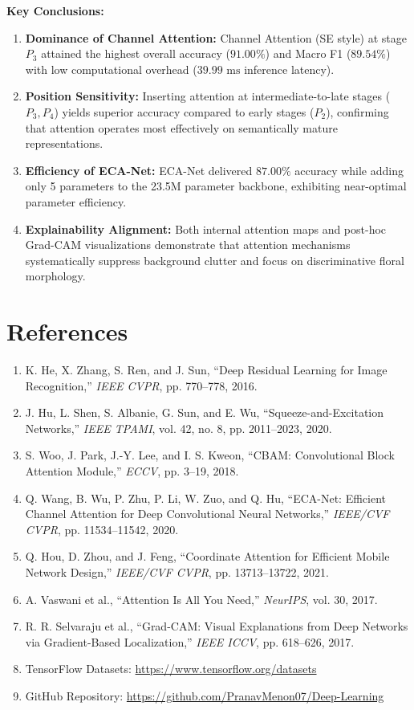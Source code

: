 \documentclass[11pt,a4paper]{article}
\begin{document}
\textbf{Key Conclusions:}
\begin{enumerate}[noitemsep,topsep=0pt]
    \item \textbf{Dominance of Channel Attention:} Channel Attention (SE style) at stage $P_3$ attained the highest overall accuracy ($91.00\%$) and Macro F1 ($89.54\%$) with low computational overhead ($39.99\text{ ms}$ inference latency).
    \item \textbf{Position Sensitivity:} Inserting attention at intermediate-to-late stages ($P_3, P_4$) yields superior accuracy compared to early stages ($P_2$), confirming that attention operates most effectively on semantically mature representations.
    \item \textbf{Efficiency of ECA-Net:} ECA-Net delivered $87.00\%$ accuracy while adding only 5 parameters to the 23.5M parameter backbone, exhibiting near-optimal parameter efficiency.
    \item \textbf{Explainability Alignment:} Both internal attention maps and post-hoc Grad-CAM visualizations demonstrate that attention mechanisms systematically suppress background clutter and focus on discriminative floral morphology.
\end{enumerate}

\section{References}
\begin{enumerate}[noitemsep,topsep=0pt]
    \item K. He, X. Zhang, S. Ren, and J. Sun, ``Deep Residual Learning for Image Recognition,'' \textit{IEEE CVPR}, pp. 770--778, 2016.
    \item J. Hu, L. Shen, S. Albanie, G. Sun, and E. Wu, ``Squeeze-and-Excitation Networks,'' \textit{IEEE TPAMI}, vol. 42, no. 8, pp. 2011--2023, 2020.
    \item S. Woo, J. Park, J.-Y. Lee, and I. S. Kweon, ``CBAM: Convolutional Block Attention Module,'' \textit{ECCV}, pp. 3--19, 2018.
    \item Q. Wang, B. Wu, P. Zhu, P. Li, W. Zuo, and Q. Hu, ``ECA-Net: Efficient Channel Attention for Deep Convolutional Neural Networks,'' \textit{IEEE/CVF CVPR}, pp. 11534--11542, 2020.
    \item Q. Hou, D. Zhou, and J. Feng, ``Coordinate Attention for Efficient Mobile Network Design,'' \textit{IEEE/CVF CVPR}, pp. 13713--13722, 2021.
    \item A. Vaswani et al., ``Attention Is All You Need,'' \textit{NeurIPS}, vol. 30, 2017.
    \item R. R. Selvaraju et al., ``Grad-CAM: Visual Explanations from Deep Networks via Gradient-Based Localization,'' \textit{IEEE ICCV}, pp. 618--626, 2017.
    \item TensorFlow Datasets: \url{https://www.tensorflow.org/datasets}
    \item GitHub Repository: \url{https://github.com/PranavMenon07/Deep-Learning}
\end{enumerate}
\end{document}
